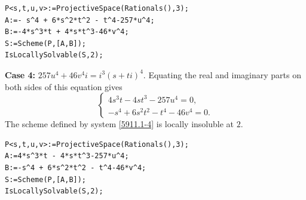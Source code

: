 \documentclass[a4paper,12pt,english,reqno]{amsart}
\begin{document}

\begin{lstlisting}
P<s,t,u,v>:=ProjectiveSpace(Rationals(),3);
A:=- s^4 + 6*s^2*t^2 - t^4-257*u^4;
B:=-4*s^3*t + 4*s*t^3-46*v^4;
S:=Scheme(P,[A,B]);
IsLocallySolvable(S,2);
\end{lstlisting}


{\bf Case 4:} $257u^4+46v^4i=i^3(s+ti)^4$. Equating the real and imaginary parts on both sides of this equation gives
\begin{equation}\label{5911.1-4}
\begin{cases}
4s^3t - 4st^3 - 257u^4=0,\\
-s^4 + 6s^2t^2 - t^4 - 46v^4=0.
\end{cases}
\end{equation}
The scheme defined by system \eqref{5911.1-4} is locally insoluble at $2$.

\begin{lstlisting}
P<s,t,u,v>:=ProjectiveSpace(Rationals(),3);
A:=4*s^3*t - 4*s*t^3-257*u^4;
B:=-s^4 + 6*s^2*t^2 - t^4-46*v^4;
S:=Scheme(P,[A,B]);
IsLocallySolvable(S,2);
\end{lstlisting}
\end{document}
